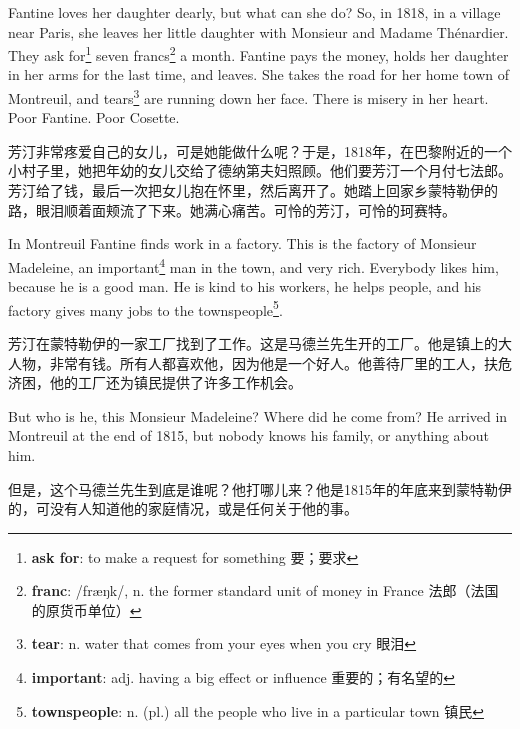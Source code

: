 \documentclass[fontset=ubuntu, zihao=5]{ctexart}
\newcommand\doulos[1]{{\fontspec{Doulos SIL} /#1/}}
\begin{document}
\begin{paracol}{2}
  \switchcolumn*

  Fantine loves her daughter dearly, but what can she do? So, in 1818, in a
  village near Paris, she leaves her little daughter with Monsieur and Madame
  Thénardier. They ask for\footnote{\textbf{ask for}: to make a request for something 要；要求} seven francs\footnote{\textbf{franc}:
    \doulos{fræŋk}, n. the former standard unit of money in France 法郎（法国
    的原货币单位）} a month. Fantine pays the money, holds her daughter in her
  arms for the last time, and leaves. She takes the road for her home town of
  Montreuil, and tears\footnote{\textbf{tear}: n. water that comes from your eyes when you cry 眼泪} are running down her face. There is misery in her
  heart. Poor Fantine. Poor Cosette.

  \switchcolumn

  芳汀非常疼爱自己的女儿，可是她能做什么呢？于是，1818年，在巴黎附近的一个小村子里，她把年幼的女儿交给了德纳第夫妇照顾。他们要芳汀一个月付七法郎。芳汀给了钱，最后一次把女儿抱在怀里，然后离开了。她踏上回家乡蒙特勒伊的路，眼泪顺着面颊流了下来。她满心痛苦。可怜的芳汀，可怜的珂赛特。

  \switchcolumn*

  In Montreuil Fantine finds work in a factory. This is the factory of
  Monsieur Madeleine, an important\footnote{\textbf{important}: adj. having a
    big effect or influence 重要的；有名望的} man in the town, and very rich.
  Everybody likes him, because he is a good man. He is kind to his workers, he
  helps people, and his factory gives many jobs to the
  townspeople\footnote{\textbf{townspeople}: n. (pl.) all the people who live
    in a particular town 镇民}.

  \switchcolumn

  芳汀在蒙特勒伊的一家工厂找到了工作。这是马德兰先生开的工厂。他是镇上的大人物，非常有钱。所有人都喜欢他，因为他是一个好人。他善待厂里的工人，扶危济困，他的工厂还为镇民提供了许多工作机会。

  \switchcolumn*

  But who is he, this Monsieur Madeleine? Where did he come from? He arrived in Montreuil at the end of 1815, but nobody knows his family, or anything about him.

  \switchcolumn

  但是，这个马德兰先生到底是谁呢？他打哪儿来？他是1815年的年底来到蒙特勒伊的，可没有人知道他的家庭情况，或是任何关于他的事。



  \switchcolumn*


\end{paracol}
\end{document}
